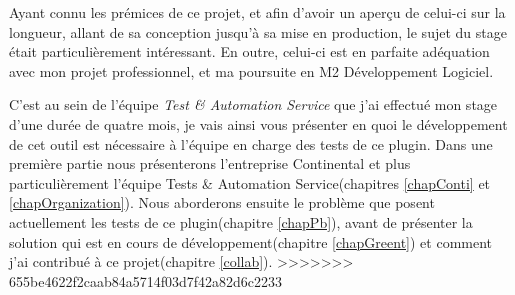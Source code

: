 Ayant connu les prémices de ce projet, et afin d'avoir un aperçu de celui-ci sur la longueur, allant de sa conception jusqu'à sa mise en production, le sujet du stage était particulièrement intéressant. En outre, celui-ci est en parfaite adéquation avec mon projet professionnel, et ma poursuite en M2 Développement Logiciel.

C'est au sein de l'équipe \textit{Test \& Automation Service} que j'ai effectué mon stage d'une durée de quatre mois, je vais ainsi vous présenter en quoi le développement de cet outil est nécessaire à l'équipe en charge des tests de ce plugin. Dans une première partie nous présenterons l'entreprise Continental et plus particulièrement l'équipe Tests \& Automation Service(chapitres \ref{chapConti} et \ref{chapOrganization}). Nous aborderons ensuite le problème que posent actuellement les tests de ce plugin(chapitre \ref{chapPb}), avant de présenter la solution qui est en cours de développement(chapitre \ref{chapGreent}) et comment j'ai contribué à ce projet(chapitre \ref{collab}). 
>>>>>>> 655be4622f2caab84a5714f03d7f42a82d6c2233
